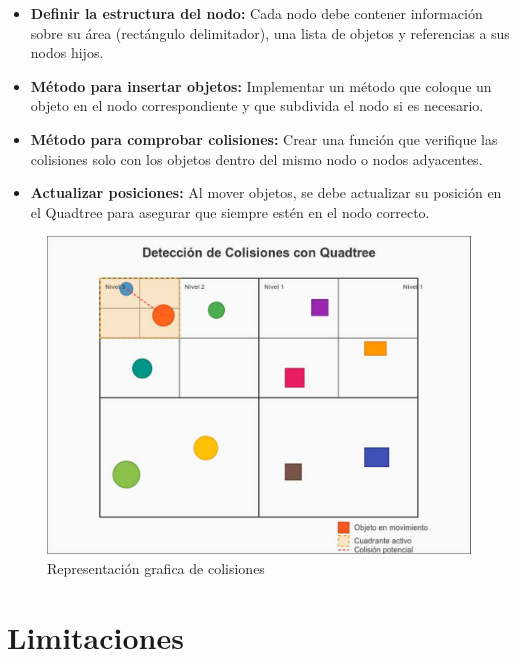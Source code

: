 \documentclass[9pt,a4paper,twoside]{rho-class/rho}
\begin{document}
        \begin{itemize}
            \item \textbf{Definir la estructura del nodo:} Cada nodo debe contener información sobre su área (rectángulo delimitador), una lista de objetos y referencias a sus nodos hijos.
            
            \item \textbf{Método para insertar objetos:} Implementar un método que coloque un objeto en el nodo correspondiente y que subdivida el nodo si es necesario.
            
            \item \textbf{Método para comprobar colisiones:} Crear una función que verifique las colisiones solo con los objetos dentro del mismo nodo o nodos adyacentes.
            
            \item \textbf{Actualizar posiciones:} Al mover objetos, se debe actualizar su posición en el Quadtree para asegurar que siempre estén en el nodo correcto.
        \end{itemize}
        \begin{figure}[h]
            \centering
            \includegraphics[width=\linewidth]{figures/quadtree-collision.pdf}
            \caption{Representación grafica de colisiones} 
            \label{fig:colision_figure}
        \end{figure}
        \section{Limitaciones}
        
\end{document}
